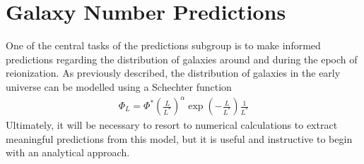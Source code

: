 
\section{Galaxy Number Predictions} %
\label{sec:galaxy_number_predictions}
	One of the central tasks of the predictions subgroup is to make informed predictions regarding the distribution of galaxies around and during the epoch of reionization. As previously described, the distribution of galaxies in the early universe can be modelled using a Schechter function
	\begin{align}
		\Phi_L = \Phi^*  \left(\frac{L}{L^*}\right)^\alpha \exp{\left( -\frac{L}{L^*} \right)} \frac{1}{L^*}
	\end{align}
	Ultimately, it will be necessary to resort to numerical calculations to extract meaningful predictions from this model, but it is useful and instructive to begin with an analytical approach.

